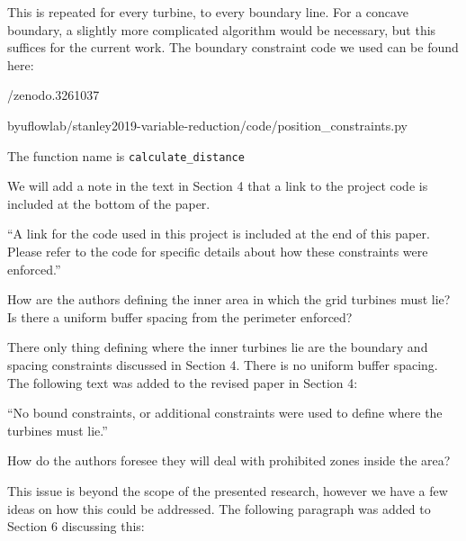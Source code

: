 \documentclass[12pt]{report}
\begin{document}
This is repeated for every turbine, to every boundary line. For a concave boundary, a slightly more complicated algorithm would be necessary, but this suffices for the current work. The boundary constraint code we used can be found here:

/zenodo.3261037 

\smallskip
byuflowlab/stanley2019-variable-reduction/code/position\_constraints.py

\smallskip
The function name is \texttt{calculate\_distance}

\smallskip
We will add a note in the text in Section 4 that a link to the project code is included at the bottom of the paper.

\smallskip
``A link for the code used in this project is included at the end of this paper. Please refer to the code for specific details about how these constraints were enforced.''

\color{black}
\bigskip

How are the authors defining the inner area in which the grid turbines must lie? Is there a uniform buffer spacing from the perimeter enforced? 

\bigskip
\color{blue}

There only thing defining where the inner turbines lie are the boundary and spacing constraints discussed in Section 4. There is no uniform buffer spacing. The following text was added to the revised paper in Section 4:

\smallskip
``No bound constraints, or additional constraints were used to define where the turbines must lie.''

\color{black}
\bigskip

How do the authors foresee they will deal with prohibited zones inside the area? 

\bigskip
\color{blue}

This issue is beyond the scope of the presented research, however we have a few ideas on how this could be addressed. The following paragraph was added to Section 6 discussing this:
\end{document}
